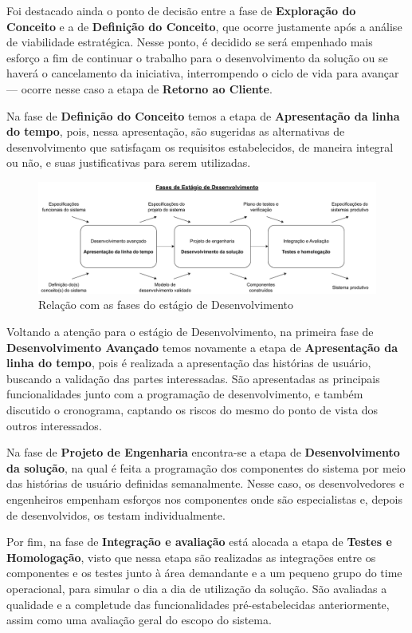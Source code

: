 	Foi destacado ainda o ponto de decisão entre a fase de \textbf{Exploração do Conceito} e a de \textbf{Definição do Conceito}, que ocorre justamente após a análise de viabilidade estratégica. Nesse ponto, é decidido se será empenhado mais esforço a fim de continuar o trabalho para o desenvolvimento da solução ou se haverá o cancelamento da iniciativa, interrompendo o ciclo de vida para avançar — ocorre nesse caso a etapa de \textbf{Retorno ao Cliente}.

	Na fase de \textbf{Definição do Conceito} temos a etapa de \textbf{Apresentação da linha do tempo}, pois, nessa apresentação, são sugeridas as alternativas de desenvolvimento que satisfaçam os requisitos estabelecidos, de maneira integral ou não, e suas justificativas para serem utilizadas.

	\begin{figure}[h]
		\centering
		\includegraphics[width=\textwidth]{./figuras/currentDevelopmentPhases.pdf}
		\caption{Relação com as fases do estágio de Desenvolvimento}
		\label{fig:metodologia:currentDevelopmentPhases}
	\end{figure}

	Voltando a atenção para o estágio de Desenvolvimento, na primeira fase de \textbf{Desenvolvimento Avançado} temos novamente a etapa de \textbf{Apresentação da linha do tempo}, pois é realizada a apresentação das histórias de usuário, buscando a validação das partes interessadas. São apresentadas as principais funcionalidades junto com a programação de desenvolvimento, e também discutido o cronograma, captando os riscos do mesmo do ponto de vista dos outros interessados.

	Na fase de \textbf{Projeto de Engenharia} encontra-se a etapa de \textbf{Desenvolvimento da solução}, na qual é feita a programação dos componentes do sistema por meio das histórias de usuário definidas semanalmente. Nesse caso, os desenvolvedores e engenheiros empenham esforços nos componentes onde são especialistas e, depois de desenvolvidos, os testam individualmente.

	Por fim, na fase de \textbf{Integração e avaliação} está alocada a etapa de \textbf{Testes e Homologação}, visto que nessa etapa são realizadas as integrações entre os componentes e os testes junto à área demandante e a um pequeno grupo do time operacional, para simular o dia a dia de utilização da solução. São avaliadas a qualidade e a completude das funcionalidades pré-estabelecidas anteriormente, assim como uma avaliação geral do escopo do sistema.

